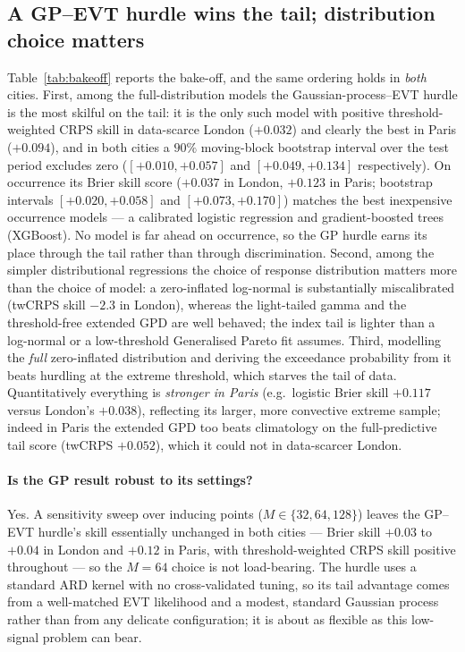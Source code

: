 \documentclass[11pt,a4paper]{article}
\begin{document}
\subsection{A GP--EVT hurdle wins the tail; distribution choice matters}\label{sec:res-bakeoff}
Table~\ref{tab:bakeoff} reports the bake-off, and the same ordering holds in
\emph{both} cities. First, among the full-distribution models the
Gaussian-process--EVT hurdle is the most skilful on the tail: it is the only such
model with positive threshold-weighted CRPS skill in data-scarce London
($+0.032$) and clearly the best in Paris ($+0.094$), and in both cities a $90\%$
moving-block bootstrap interval over the test period excludes zero
($[+0.010,+0.057]$ and $[+0.049,+0.134]$ respectively). On occurrence its Brier
skill score ($+0.037$ in London, $+0.123$ in Paris; bootstrap intervals
$[+0.020,+0.058]$ and $[+0.073,+0.170]$) matches the best inexpensive
occurrence models --- a calibrated logistic regression and gradient-boosted trees
(XGBoost). No model is far ahead on occurrence, so the GP hurdle earns its place
through the tail rather than through discrimination. Second, among the simpler
distributional regressions the choice of response distribution matters more than
the choice of model: a zero-inflated log-normal is substantially miscalibrated
(twCRPS skill $-2.3$ in London), whereas the light-tailed gamma and the
threshold-free extended GPD are well behaved; the index tail is lighter than a
log-normal or a low-threshold Generalised Pareto fit assumes. Third, modelling the
\emph{full} zero-inflated distribution and deriving the exceedance probability
from it beats hurdling at the extreme threshold, which starves the tail of data.
Quantitatively everything is \emph{stronger in Paris} (e.g.\ logistic Brier skill
$+0.117$ versus London's $+0.038$), reflecting its larger, more convective extreme
sample; indeed in Paris the extended GPD too beats climatology on the
full-predictive tail score (twCRPS $+0.052$), which it could not in data-scarcer
London.



\paragraph{Is the GP result robust to its settings?} Yes. A sensitivity sweep over
inducing points ($M\in\{32,64,128\}$) leaves the GP--EVT hurdle's skill
essentially unchanged in both cities --- Brier skill $+0.03$ to $+0.04$ in London
and $+0.12$ in Paris, with threshold-weighted CRPS skill positive throughout ---
so the $M=64$ choice is not load-bearing. The hurdle uses a standard ARD kernel
with no cross-validated tuning, so its tail advantage comes from a well-matched
EVT likelihood and a modest, standard Gaussian process rather than from any
delicate configuration; it is about as flexible as this low-signal
problem can bear.
\end{document}

